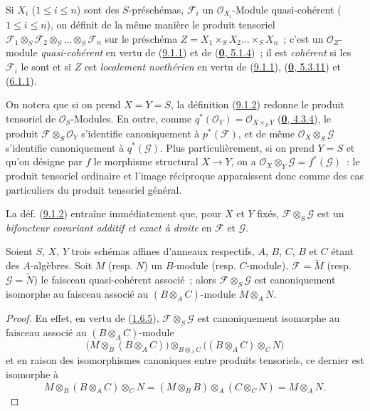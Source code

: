 Si $X_i$ ($1\leq i\leq n$) sont des $S$-préschémas, $\mathscr{F}_i$ un
$\mathscr{O}_{X_i}$-Module quasi-cohérent ($1\leq i\leq n$), on définit de
la même manière le produit tensoriel
$\mathscr{F}_1\otimes_S\mathscr{F}_2\otimes_S\ldots\otimes_S\mathscr{F}_n$
sur le préschéma
$Z=X_1\times_S X_2\ldots\times_S X_n$~; c'est un
$\mathscr{O}_Z$-module \emph{quasi-cohérent} en vertu de
(\hyperref[I.9.1.1-fr]{9.1.1}) et de
(\hyperref[0.5.1.4-fr]{\textbf{0}, 5.1.4})~; il est \emph{cohérent} si les
$\mathscr{F}_i$ le sont et si $Z$ est \emph{localement noethérien} en vertu
de (\hyperref[I.9.1.1-fr]{9.1.1}),
(\hyperref[0.5.3.11-fr]{\textbf{0}, 5.3.11}) et
(\hyperref[I.6.1.1-fr]{6.1.1}).

On notera que si on prend $X=Y=S$, la définition
(\hyperref[I.9.1.2-fr]{9.1.2}) redonne le produit tensoriel de
$\mathscr{O}_S$-Modules. En outre, comme
$q^*(\mathscr{O}_Y)=\mathscr{O}_{X\times_S Y}$
(\hyperref[0.4.3.4-fr]{\textbf{0}, 4.3.4}), le produit
$\mathscr{F}\otimes_S\mathscr{O}_Y$ s'identifie canoniquement à
$p^*(\mathscr{F})$, et de même
$\mathscr{O}_X\otimes_S\mathscr{G}$ s'identifie canoniquement à
$q^*(\mathscr{G})$. Plus particulièrement, si on prend $Y=S$ et qu'on
désigne par $f$ le morphisme structural $X\to Y$, on a
$\mathscr{O}_X\otimes_Y\mathscr{G}=f^*(\mathscr{G})$~: le produit tensoriel
ordinaire et l'image réciproque apparaissent donc comme des cas particuliers
du produit tensoriel général.

La déf. (\hyperref[I.9.1.2-fr]{9.1.2}) entraîne immédiatement que, pour $X$
et $Y$ fixés, $\mathscr{F}\otimes_S\mathscr{G}$ est un
\emph{bifoncteur covariant additif et exact à droite} en $\mathscr{F}$ et
$\mathscr{G}$.

\begin{proposition}[9.1.3]
\label{I.9.1.3-fr}
Soient $S$, $X$, $Y$ trois schémas affines d'anneaux respectifs, $A$, $B$,
$C$, $B$ et $C$ étant des $A$-algèbres. Soit $M$ \textup{(resp. $N$)} un $B$-module
\textup{(resp.} $C$-module), $\mathscr{F}=\widetilde{M}$ \textup{(resp.}
$\mathscr{G}=\widetilde{N}$) le faisceau quasi-cohérent associé~; alors
$\mathscr{F}\otimes_S\mathscr{G}$ est canoniquement isomorphe au faisceau
associé au $(B\otimes_A C)$-module $M\otimes_A N$.
\end{proposition}

\begin{proof}
En effet, en vertu de (\hyperref[I.1.6.5-fr]{1.6.5}),
$\mathscr{F}\otimes_S\mathscr{G}$ est canoniquement isomorphe au faisceau
associé au $(B\otimes_A C)$-module
\[
  \bigl(M\otimes_B(B\otimes_A C)\bigr)
  \otimes_{B\otimes_A C}
  \bigl((B\otimes_A C)\otimes_C N\bigr)
\]
et en raison des isomorphismes canoniques entre produits tensoriels, ce
dernier est isomorphe à
\[
  M\otimes_B(B\otimes_A C)\otimes_C N
  =(M\otimes_B B)\otimes_A(C\otimes_C N)=M\otimes_A N.
\]
\end{proof}

